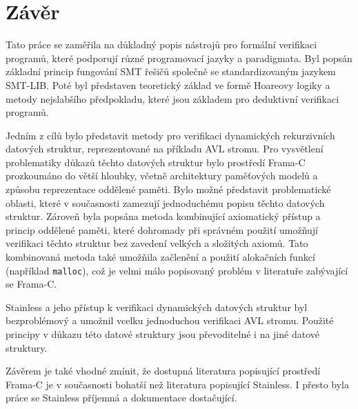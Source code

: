 \chapter*{Závěr}

Tato práce se zaměřila na důkladný popis nástrojů pro formální verifikaci programů,
které podporují různé programovací jazyky a paradigmata.
Byl popsán základní princip fungování SMT řešičů společně se standardizovaným jazykem SMT-LIB\@.
Poté byl představen teoretický základ ve formě Hoareovy logiky a metody nejslabšího předpokladu,
které jsou základem pro deduktivní verifikaci programů.

Jedním z cílů bylo představit metody pro verifikaci dynamických rekurzivních datových struktur,
reprezentované na příkladu AVL stromu.
Pro vysvětlení problematiky důkazů těchto datových struktur
bylo prostředí Frama\mbox{-}C prozkoumáno do větší hloubky,
včetně architektury paměťových modelů a způsobu reprezentace oddělené paměti.
Bylo možné představit problematické oblasti,
které v současnosti zamezují jednoduchému popisu těchto datových struktur.
Zároveň byla popsána metoda kombinující axiomatický přístup a princip oddělené paměti,
které dohromady při správném použití umožňují verifikaci těchto struktur
bez zavedení velkých a složitých axiomů.
Tato kombinovaná metoda také umožňila začlenění a použití alokačních funkcí (například \texttt{malloc}),
což je velmi málo popisovaný problém v literatuře zabývající se Frama\mbox{-}C\@.

Stainless a jeho přístup k verifikaci dynamických datových struktur
byl bezproblémový a umožnil vcelku jednoduchou verifikaci AVL stromu.
Použité principy v důkazu této datové struktury jsou převoditelné
i na jiné datové struktury.

Závěrem je také vhodné zmínit, že dostupná literatura popisující prostředí Frama\mbox{-}C
je v současnosti bohatší než literatura popisující Stainless.
I přesto byla práce se Stainless příjemná a dokumentace dostačující.
